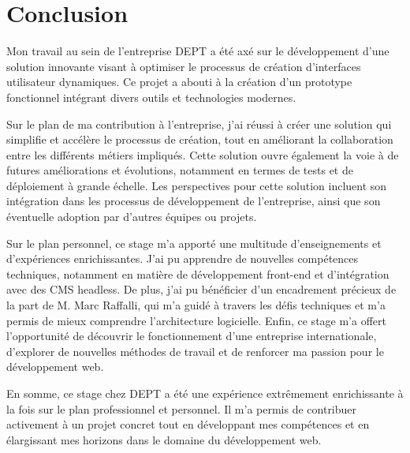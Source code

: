 \chapter{Conclusion}
Mon travail au sein de l'entreprise DEPT a été axé sur le développement d'une solution innovante visant à optimiser le processus de création d'interfaces utilisateur dynamiques. Ce projet a abouti à la création d'un prototype fonctionnel intégrant divers outils et technologies modernes.

Sur le plan de ma contribution à l'entreprise, j'ai réussi à créer une solution qui simplifie et accélère le processus de création, tout en améliorant la collaboration entre les différents métiers impliqués. Cette solution ouvre également la voie à de futures améliorations et évolutions, notamment en termes de tests et de déploiement à grande échelle. Les perspectives pour cette solution incluent son intégration dans les processus de développement de l'entreprise, ainsi que son éventuelle adoption par d'autres équipes ou projets.

Sur le plan personnel, ce stage m'a apporté une multitude d'enseignements et d'expériences enrichissantes. J'ai pu apprendre de nouvelles compétences techniques, notamment en matière de développement front-end et d'intégration avec des CMS headless. De plus, j'ai pu bénéficier d'un encadrement précieux de la part de M. Marc Raffalli, qui m'a guidé à travers les défis techniques et m'a permis de mieux comprendre l'architecture logicielle. Enfin, ce stage m'a offert l'opportunité de découvrir le fonctionnement d'une entreprise internationale, d'explorer de nouvelles méthodes de travail et de renforcer ma passion pour le développement web.

En somme, ce stage chez DEPT a été une expérience extrêmement enrichissante à la fois sur le plan professionnel et personnel. Il m'a permis de contribuer activement à un projet concret tout en développant mes compétences et en élargissant mes horizons dans le domaine du développement web.